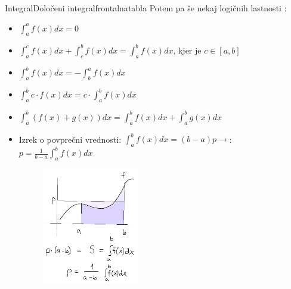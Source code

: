 \begin{priprava}{}{}{Integral}{Določeni integral}{frontalna}{tabla}
Potem pa še nekaj logičnih lastnosti :



\begin{itemize}
    \item $ \int_a^a f(x) dx = 0 $
    \item $ \int_a^c f(x) dx + \int_c^b f(x) dx = \int_a^b f(x) dx $, kjer je $ c \in [a, b] $
    \item $ \int_a^b f(x) dx = - \int_b^a f(x) dx $ 
    \item $ \int_a^b c \cdot f(x) dx = c \cdot \int_a^b f(x) dx $
    \item $\int_a^b (f(x) + g(x)) dx = \int_a^b f(x) dx + \int_a^b g(x) dx $
    \item Izrek o povprečni vrednosti: $ \int_a^b f(x) dx = (b-a)p \rightarrow $: $ p = \frac{1}{b - a} \int_a^b f(x) dx $

\newpage

\begin{figure}[h]
    \centering
    \includegraphics[width=0.4\textwidth]{slike/povprecna_vrednost.png}
\end{figure}

\end{itemize}



\end{priprava}
